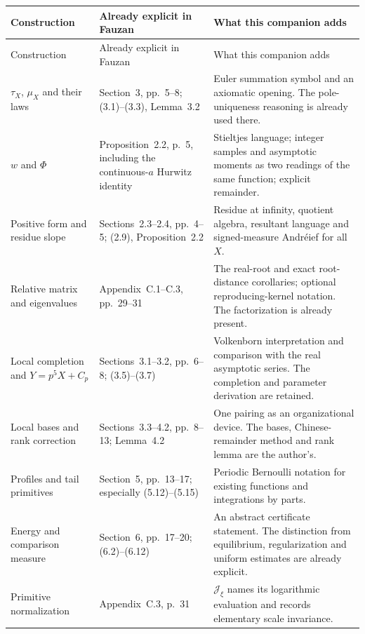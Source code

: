 \documentclass[11pt]{article}
\theoremstyle{definition}
\theoremstyle{remark}\newtheorem*{remark}{Remark}
\begin{document}
\begin{longtable}{>{\raggedright\arraybackslash}p{}>{\raggedright\arraybackslash}p{}>{\raggedright\arraybackslash}p{}}
\toprule
Construction & Already explicit in Fauzan & What this companion adds\\ \midrule
\endfirsthead
\toprule Construction & Already explicit in Fauzan & What this companion adds\\ \midrule
\endhead
$\tau_X$, $\mu_X$ and their laws & Section~3, pp.~5--8; (3.1)--(3.3), Lemma~3.2 &
Euler summation symbol and an axiomatic opening. The pole-uniqueness reasoning is already used there.\\[5pt]
$w$ and $\Phi$ & Proposition~2.2, p.~5, including the continuous-$a$ Hurwitz identity &
Stieltjes language; integer samples and asymptotic moments as two readings of the same function; explicit remainder.\\[5pt]
Positive form and residue slope & Sections~2.3--2.4, pp.~4--5; (2.9), Proposition~2.2 &
Residue at infinity, quotient algebra, resultant language and signed-measure Andr\'eief for all $X$.\\[5pt]
Relative matrix and eigenvalues & Appendix~C.1--C.3, pp.~29--31 &
The real-root and exact root-distance corollaries; optional reproducing-kernel notation. The factorization is already present.\\[5pt]
Local completion and $Y=p^5X+C_p$ & Sections~3.1--3.2, pp.~6--8; (3.5)--(3.7) &
Volkenborn interpretation and comparison with the real asymptotic series. The completion and parameter derivation are retained.\\[5pt]
Local bases and rank correction & Sections~3.3--4.2, pp.~8--13; Lemma~4.2 &
One pairing as an organizational device. The bases, Chinese-remainder method and rank lemma are the author's.\\[5pt]
Profiles and tail primitives & Section~5, pp.~13--17; especially (5.12)--(5.15) &
Periodic Bernoulli notation for existing functions and integrations by parts.\\[5pt]
Energy and comparison measure & Section~6, pp.~17--20; (6.2)--(6.12) &
An abstract certificate statement. The distinction from equilibrium, regularization and uniform estimates are already explicit.\\[5pt]
Primitive normalization & Appendix~C.3, p.~31 &
$\mathcal J_\xi$ names its logarithmic evaluation and records elementary scale invariance.\\
\bottomrule
\end{longtable}
\end{document}
